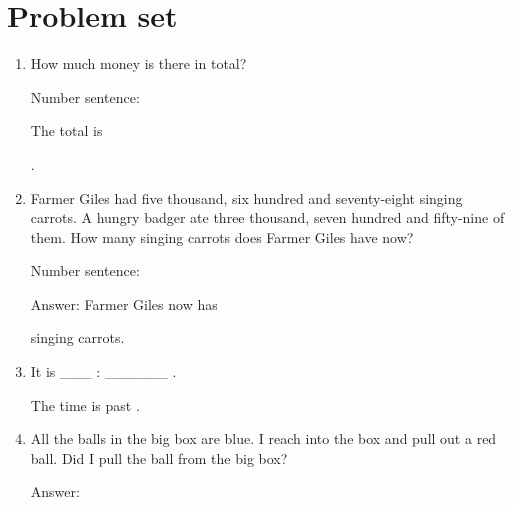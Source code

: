 \documentclass{tufte-book}
\begin{document}
\clearpage\section{Problem set }

\begin{enumerate}

\item {}
How much money is there in total?\medskip

Number sentence: \dotfill\medskip

The total is \dotfill\medskip\par\mbox{}\dotfill\medskip\par\mbox{}\dotfill\bigskip.

\item Farmer Giles had five thousand, six hundred and seventy-eight singing carrots. A hungry badger ate three thousand, seven hundred and fifty-nine of them. How many singing carrots does Farmer Giles have now?\medskip\par
Number sentence: \dotfill\medskip\par
Answer: Farmer Giles now has 
\dotfill\medskip\par\mbox{}\dotfill\medskip\par\mbox{}\dotfill\bigskip
 singing carrots.


\item {}
 It is \_\_\_ : \_\_\_\_\_\_ . \bigskip\par
 The time is \dotfill past \dotfill\medskip.
 
\item All the balls in the big box are blue. I reach into the box and pull out a red ball. Did I pull the ball from the big box?\medskip\par
Answer: \dotfill\medskip
\end{enumerate}
\end{document}
